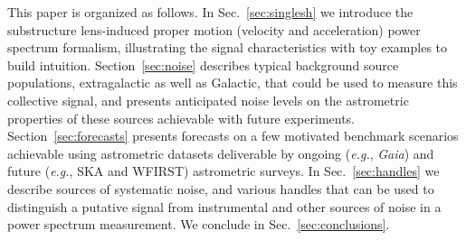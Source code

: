 \documentclass[twocolumn]{aastex63}
\newcommand{\Gaia}{\emph{Gaia}}
\begin{document}
This paper is organized as follows. In Sec.~\ref{sec:singlesh} we introduce the substructure lens-induced proper motion (velocity and acceleration) power spectrum formalism, illustrating the signal characteristics with toy examples to build intuition. Section~\ref{sec:noise} describes typical background source populations, extragalactic as well as Galactic, that could be used to measure this collective signal, and presents anticipated noise levels on the astrometric properties of these sources achievable with future experiments.  Section~\ref{sec:forecasts} presents forecasts on a few motivated benchmark scenarios achievable using astrometric datasets deliverable by ongoing (\emph{e.g.}, \Gaia) and future (\emph{e.g.}, SKA and WFIRST) astrometric surveys. In Sec.~\ref{sec:handles} we describe sources of systematic noise, and various handles that can be used to distinguish a putative signal from instrumental and other sources of noise in a power spectrum measurement. 
We conclude in Sec.~\ref{sec:conclusions}.

\end{document}
